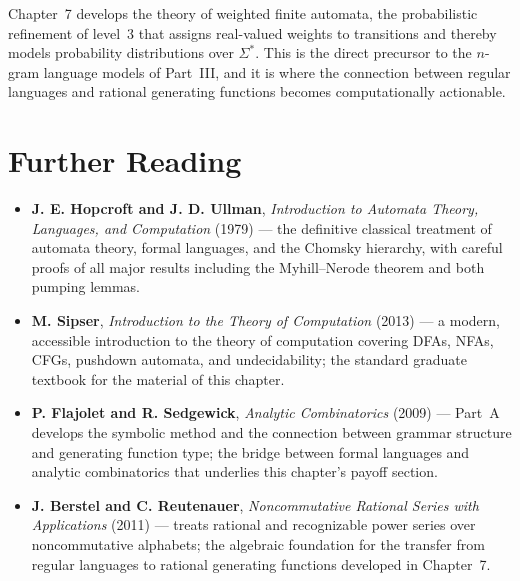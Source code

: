 Chapter~7 develops the theory of weighted finite automata, the probabilistic refinement of level~3 that assigns real-valued weights to transitions and thereby models probability distributions over $\Sigma^*$. This is the direct precursor to the $n$-gram language models of Part~III, and it is where the connection between regular languages and rational generating functions becomes computationally actionable.

\section*{Further Reading}

\begin{itemize}
  \item \textbf{J. E. Hopcroft and J. D. Ullman}, \emph{Introduction to Automata Theory, Languages, and Computation} (1979) \cite{HopcroftUllman1979} --- the definitive classical treatment of automata theory, formal languages, and the Chomsky hierarchy, with careful proofs of all major results including the Myhill--Nerode theorem and both pumping lemmas.
  \item \textbf{M. Sipser}, \emph{Introduction to the Theory of Computation} (2013) \cite{Sipser2013} --- a modern, accessible introduction to the theory of computation covering DFAs, NFAs, CFGs, pushdown automata, and undecidability; the standard graduate textbook for the material of this chapter.
  \item \textbf{P. Flajolet and R. Sedgewick}, \emph{Analytic Combinatorics} (2009) \cite{FlajoletSedgewick2009} --- Part~A develops the symbolic method and the connection between grammar structure and generating function type; the bridge between formal languages and analytic combinatorics that underlies this chapter's payoff section.
  \item \textbf{J. Berstel and C. Reutenauer}, \emph{Noncommutative Rational Series with Applications} (2011) \cite{BerstelReutenauer2011} --- treats rational and recognizable power series over noncommutative alphabets; the algebraic foundation for the transfer from regular languages to rational generating functions developed in Chapter~7.
\end{itemize}
